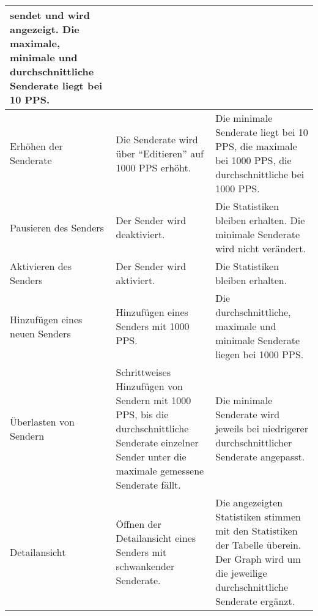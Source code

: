 \begin{table}[h]
\begin{center}
\begin{tabular}{|p{2.5cm}|p{5cm}|p{7.55cm}|}
                    sendet und wird angezeigt. Die maximale, minimale und
                    durchschnittliche Senderate liegt bei 10 PPS. \\
                \hline
                    Erhöhen der Senderate & Die Senderate wird über
                    "`Editieren"' auf 1000 PPS erhöht. &  Die minimale Senderate
                    liegt bei 10 PPS, die maximale bei 1000 PPS, die
                    durchschnittliche bei 1000 PPS.\\
                \hline
                    Pausieren des Senders & Der Sender wird deaktiviert. & Die
                    Statistiken bleiben erhalten. Die minimale Senderate wird
                    nicht verändert. \\
                \hline
                    Aktivieren des Senders & Der Sender wird aktiviert. & Die
                    Statistiken bleiben erhalten. \\
                \hline
                    Hinzufügen eines neuen Senders & Hinzufügen eines Senders
                    mit 1000 PPS. & Die durchschnittliche, maximale und minimale
                    Senderate liegen bei 1000 PPS. \\
                \hline
                    Überlasten von Sendern & Schrittweises Hinzufügen von
                    Sendern mit 1000 PPS, bis die durchschnittliche Senderate
                    einzelner Sender unter die maximale gemessene Senderate
                    fällt. & Die minimale Senderate wird jeweils bei niedrigerer
                    durchschnittlicher Senderate angepasst.\\
                \hline
                    Detailansicht & Öffnen der Detailansicht eines Senders mit
                    schwankender Senderate. & Die angezeigten Statistiken
                    stimmen mit den Statistiken der Tabelle überein. Der Graph
                    wird um die jeweilige durchschnittliche Senderate ergänzt.\\
                \hline
            \end{tabular}
        \end{center}
    \end{table}
    
